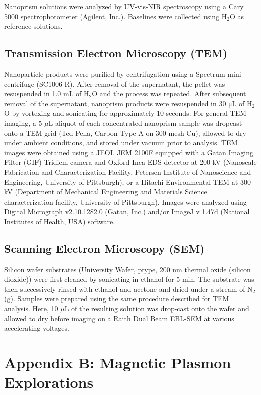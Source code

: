 \documentclass [11pt, proquest] {uwthesis}[2016/11/22]
\begin{document}
Nanoprism solutions were analyzed by UV-vis-NIR spectroscopy using a Cary 5000 spectrophotometer (Agilent, Inc.). Baselines were collected using H$_2$O as reference solutions.

\section{Transmission Electron Microscopy (TEM)}

Nanoparticle products were purified by centrifugation using a Spectrum mini-centrifuge (SC1006-R). After removal of the supernatant, the pellet was resuspended in 1.0 mL of H$_2$O and the process was repeated. After subsequent removal of the supernatant, nanoprism products were resuspended in 30 μL of H$_2$O by vortexing and sonicating for approximately 10 seconds. For general TEM imaging, a 5 $\mu$L aliquot of each concentrated nanoprism sample was dropcast onto a TEM grid (Ted Pella, Carbon Type A on 300 mesh Cu), allowed to dry under ambient conditions, and stored under vacuum prior to analysis. TEM images were obtained using a JEOL JEM 2100F equipped with a Gatan Imaging Filter (GIF) Tridiem camera and Oxford Inca EDS detector at 200 kV (Nanoscale Fabrication and Characterization Facility, Petersen Institute of Nanoscience and Engineering, University of Pittsburgh), or a Hitachi Environmental TEM at 300 kV (Department of Mechanical Engineering and Materials Science characterization facility, University of Pittsburgh). Images were analyzed using Digital Micrograph v2.10.1282.0 (Gatan, Inc.) and/or ImageJ v 1.47d (National Institutes of Health, USA) software.

\section{Scanning Electron Microscopy (SEM)}

Silicon wafer substrates (University Wafer, ptype, 200 nm thermal oxide (silicon dioxide)) were first cleaned by sonicating in ethanol for 5 min. The substrate was then successively rinsed with ethanol and acetone and dried under a stream of N$_2$(g). Samples were prepared using the same procedure described for TEM analysis. Here, 10 $\mu$L of the resulting solution was drop-cast onto the wafer and allowed to dry before imaging on a Raith Dual Beam EBL-SEM at various accelerating voltages.


\chapter{Appendix B: Magnetic Plasmon Explorations}
\end{document}
